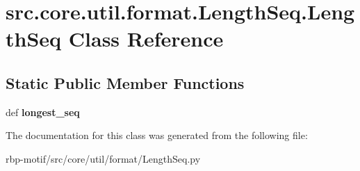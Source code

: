\hypertarget{classsrc_1_1core_1_1util_1_1format_1_1LengthSeq_1_1LengthSeq}{\section{src.\-core.\-util.\-format.\-Length\-Seq.\-Length\-Seq Class Reference}
\label{classsrc_1_1core_1_1util_1_1format_1_1LengthSeq_1_1LengthSeq}
}
\subsection*{Static Public Member Functions}
\begin{DoxyCompactItemize}
\item 
\hypertarget{classsrc_1_1core_1_1util_1_1format_1_1LengthSeq_1_1LengthSeq_a854767f4696701e7800d4df33a81440b}{def {\bfseries longest\-\_\-seq}}\label{classsrc_1_1core_1_1util_1_1format_1_1LengthSeq_1_1LengthSeq_a854767f4696701e7800d4df33a81440b}

\end{DoxyCompactItemize}


The documentation for this class was generated from the following file\-:\begin{DoxyCompactItemize}
\item 
rbp-\/motif/src/core/util/format/Length\-Seq.\-py\end{DoxyCompactItemize}
